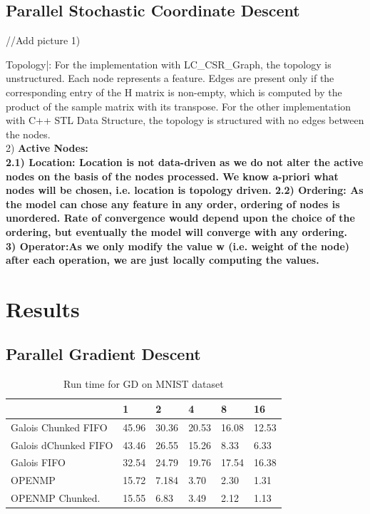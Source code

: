 \documentclass{sigplanconf}
\begin{document}
\subsection{Parallel Stochastic Coordinate Descent}
//Add picture
1) \bf{Topology|: \rm For the implementation with LC\_CSR\_Graph, the topology is unstructured. Each node represents a feature. Edges are present only if the corresponding entry of the H matrix is non-empty, which is computed by the product of the sample matrix with its transpose. For the other implementation with C++ STL Data Structure, the topology is structured with no edges between the nodes.\\
2) \bf{Active Nodes}:\rm \\
2.1) \bf{Location}: \rm Location is not data-driven as we do not alter the active nodes on the basis of the
nodes processed. We know a-priori what nodes will be chosen, i.e. location is topology driven.
2.2) Ordering: As the model can chose any feature in any order, ordering of nodes is unordered. Rate
of convergence would depend upon the choice of the ordering, but eventually the model will converge
with any ordering. \\
3) \bf{ Operator}:\rm As we only modify the value w (i.e. weight of the node) after each operation, we are just
locally computing the values.\\

\section{Results}

\subsection{Parallel Gradient Descent}	
\begin{table}[htbp]
\caption{Run time for GD on MNIST dataset}
\begin{tabular}{|p{9em}|p{2em}|p{2em}|p{2em}|p{2em}|p{2em}|}
\hline
 & 1 & 2 & 4 & 8 & 16 \\ \hline
Galois Chunked FIFO & 45.96 & 30.36 & 20.53 & 16.08 & 12.53 \\ \hline
Galois dChunked FIFO & 43.46 & 26.55 & 15.26 & 8.33 & 6.33 \\ \hline
Galois FIFO & 32.54 & 24.79 & 19.76 & 17.54 & 16.38 \\ \hline
OPENMP & 15.72 & 7.184 & 3.70 & 2.30 & 1.31 \\ \hline
OPENMP Chunked. & 15.55 & 6.83 & 3.49 & 2.12 & 1.13 \\ \hline
\end{tabular}
\end{table}
	
}
\end{document}

